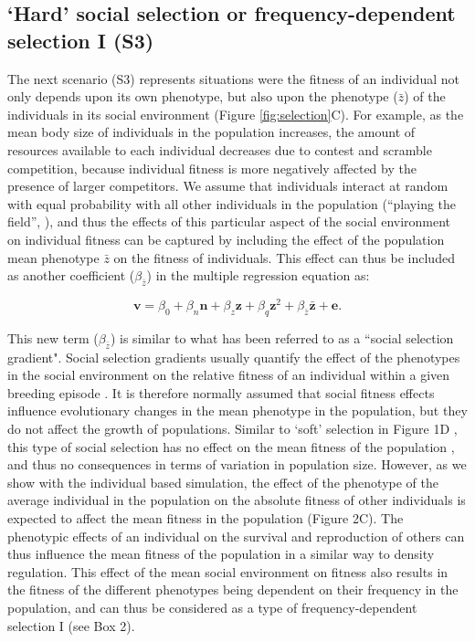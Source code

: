 \documentclass{article}
\begin{document}
\subsection{`Hard' social selection or frequency-dependent selection I (S3)}
The next scenario (S3) represents situations were the fitness of an individual not only depends upon its own phenotype, but also upon the phenotype ($\bar{z}$) of the individuals in its social environment (Figure \ref{fig:selection}C). For example, as the mean body size of individuals in the population increases, the amount of resources available to each individual decreases due to contest and scramble competition, because individual fitness is more negatively affected by the presence of larger competitors. We assume that individuals interact at random with equal probability with all other individuals in the population (“playing the field”, \cite{MaynardSmith1982}), and thus the effects of this particular aspect of the social environment on individual fitness can be captured by including the effect of the population mean phenotype $\bar{z}$ on the fitness of individuals. This effect can thus be included as another coefficient ($\beta_{\bar{z}}$) in the multiple regression equation as:  

\begin{equation} \label{eq: socialselection}
\bm{v}=\beta_{0} +\beta_{n} \bm{n} + \beta_{z} \bm{z} + \beta_{q} \bm{z}^2 + \beta_{\bar{z}} \bar{\bm{z}}+ \bm{e}.
\end{equation}

This new term ($\beta_{\bar{z}}$) is similar to what has been referred to as a “social selection gradient". Social selection gradients usually quantify the effect of the phenotypes in the social environment on the relative fitness of an individual within a given breeding episode \citep{Wolf1999SocialSelection}. It is therefore normally assumed that social fitness effects influence evolutionary changes in the mean phenotype in the population, but they do not affect the growth of populations. Similar to `soft' selection in Figure 1D \citep{Wallace1975, Bell2021}, this type of social selection has no effect on the mean fitness of the population \citep{Goodnight1992}, and thus no consequences in terms of variation in population size. However, as we show with the individual based simulation, the effect of the phenotype of the average individual in the population on the absolute fitness of other individuals is expected to affect the mean fitness in the population (Figure 2C). The phenotypic effects of an individual on the survival and reproduction of others can thus influence the mean fitness of the population in a similar way to density regulation. This effect of the mean social environment on fitness also results in the fitness of the different phenotypes being dependent on their frequency in the population, and can thus be considered as a type of frequency-dependent selection I (see Box 2). 
\end{document}
